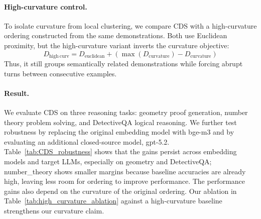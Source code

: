 \paragraph{High-curvature control.}
To isolate curvature from local clustering, we compare CDS with a high-curvature ordering constructed from the same demonstrations.
Both use Euclidean proximity, but the high-curvature variant inverts the curvature objective:
$$D_{\mathrm{high\ curv}} = D_{\mathrm{euclidean}} + \left(\max(D_{\mathrm{curvature}})-D_{\mathrm{curvature}}\right)$$
Thus, it still groups semantically related demonstrations while forcing abrupt turns between consecutive examples.



\paragraph{Result.} We evaluate CDS on three reasoning tasks: geometry proof generation, number theory problem solving, and DetectiveQA logical reasoning.
We further test robustness by replacing the original embedding model with bge-m3 and by evaluating an additional closed-source model, gpt-5.2.
Table~\ref{tab:CDS_robustness} shows that the gains persist across embedding models and target LLMs, especially on geometry and DetectiveQA; number\_theory shows smaller margins because baseline accuracies are already high, leaving less room for ordering to improve performance.
The performance gains also depend on the curvature of the original ordering. Our ablation in Table~\ref{tab:high_curvature_ablation} against a high-curvature baseline strengthens our curvature claim.



